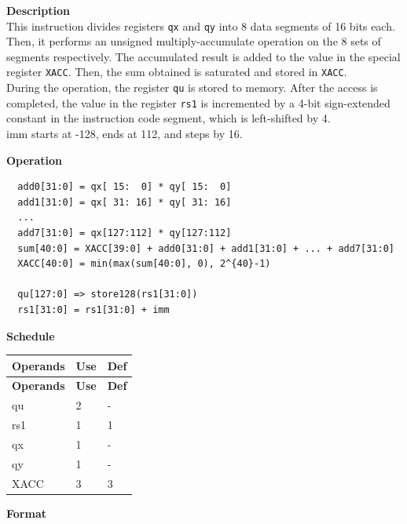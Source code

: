 \textbf{Description}\\
This instruction divides registers \lstinline{qx} and \lstinline{qy} into 8 data segments of 16 bits each. Then, it performs an unsigned multiply-accumulate operation on the 8 sets of segments respectively. The accumulated result is added to the value in the special register \lstinline{XACC}. Then, the sum obtained is saturated and stored in \lstinline{XACC}. \\ During the operation, the register \lstinline{qu} is stored to memory. After the access is completed, the value in the register \lstinline{rs1} is incremented by a 4-bit sign-extended constant in the instruction code segment, which is left-shifted by 4.\\

imm starts at -128, ends at 112, and steps by 16.

\textbf{Operation}
\begin{lstlisting}
  add0[31:0] = qx[ 15:  0] * qy[ 15:  0]
  add1[31:0] = qx[ 31: 16] * qy[ 31: 16]
  ...
  add7[31:0] = qx[127:112] * qy[127:112]
  sum[40:0] = XACC[39:0] + add0[31:0] + add1[31:0] + ... + add7[31:0]
  XACC[40:0] = min(max(sum[40:0], 0), 2^{40}-1)

  qu[127:0] => store128(rs1[31:0])
  rs1[31:0] = rs1[31:0] + imm
\end{lstlisting}

\textbf{Schedule}\\
\begin{longtable}[c]{|l|l|l|}
    \hline
    \rowcolor{lightgray}
    \textbf{Operands} & \textbf{Use} & \textbf{Def} \\\hline
    \endfirsthead
    \hline
    \rowcolor{lightgray}
     \textbf{Operands} & \textbf{Use} & \textbf{Def} \\\hline
    \endhead
    \hline
    \endfoot

    qu & 2 & - \\\hline
    rs1 & 1 & 1 \\\hline
     qx & 1 & - \\\hline
     qy & 1 & - \\\hline
     XACC & 3 & 3

\end{longtable}

\textbf{Format}\\

